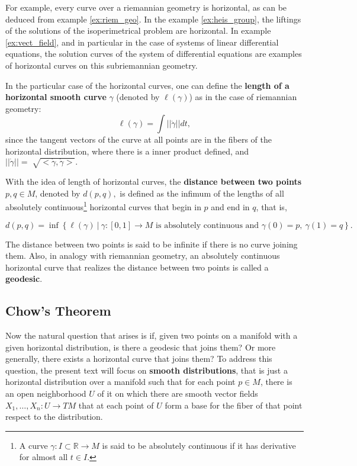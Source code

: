 \documentclass[12pt, letterpaper, reqno]{amsart}
\theoremstyle{definition}
\theoremstyle{plain}
\theoremstyle{remark}
\begin{document}
For example, every curve over a riemannian geometry is horizontal, as can be deduced from example \ref{ex:riem_geo}. In the example \ref{ex:heis_group}, the liftings of the solutions of the isoperimetrical problem are horizontal. In example \ref{ex:vect_field}, and in particular in the case of systems of linear differential equations, the solution curves of the system of differential equations are examples of horizontal curves on this subriemannian geometry.

In the particular case of the horizontal curves, one can define the \textbf{length of a horizontal smooth curve} $ \gamma $ (denoted by $ \ell(\gamma) $) as in the case of riemannian geometry:
$$ \ell(\gamma) = \int ||\dot{\gamma}|| dt, $$ 
since the tangent vectors of the curve at all points are in the fibers of the horizontal distribution, where there is a inner product defined, and $ ||\dot{\gamma}||= \sqrt[]{<\dot{\gamma}, \dot{\gamma}>}.  $   

With the idea of length of horizontal curves, the \textbf{distance between two points} $ p,q\in M $, denoted by $ d(p,q), $   is defined as the infimum of the lengths of all absolutely continuous\footnote{A curve $ \gamma:I\subset \mathbb{R}  \rightarrow {M} $ is said to be absolutely continuous if it has derivative for almost all $ t\in I. $ } horizontal curves that begin in $ p $ and end in $ q $, that is, 

$$ d(p,q) = \operatorname{inf} \left\{ \ell(\gamma) \ |\ \gamma:[0,1] \rightarrow {M} \text{ is absolutely continuous and }\gamma(0)=p, \ \gamma(1)=q \right\}. $$ 

The distance between two points is said to be infinite if there is no curve joining them. Also, in analogy with riemannian geometry, an absolutely continuous horizontal curve that realizes the distance between two points is called a \textbf{geodesic}. 

\subsection{Chow's Theorem}%
\label{sub:chow_s_theorem}


Now the natural question that arises is if, given two points on a manifold with a given horizontal distribution, is there a geodesic that joins them? Or more generally, there exists a horizontal curve that joins them? To address this question, the present text will focus on \textbf{smooth distributions}, that is just a horizontal distribution over a manifold such that for each point $ p\in M $, there is an open neighborhood $ U $ of it on which there are smooth vector fields $ X_1,\dots,X_n: U \rightarrow {TM} $ that at each point of $ U $ form a base for the fiber of that point respect to the distribution.
\end{document}
